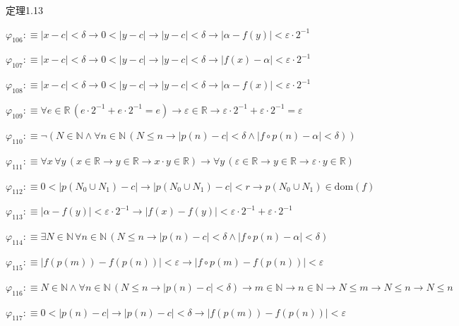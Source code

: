 \begin{fullproof}{定理1.13}
\begin{abbrevlist}
\item $\varphi_{106} :\equiv \lvert x - c \rvert < \delta \to 0 < \lvert y - c \rvert \to \lvert y - c \rvert < \delta \to \lvert \alpha - f(y) \rvert < \varepsilon \cdot 2^{-1}$
\item $\varphi_{107} :\equiv \lvert x - c \rvert < \delta \to 0 < \lvert y - c \rvert \to \lvert y - c \rvert < \delta \to \lvert f(x) - \alpha \rvert < \varepsilon \cdot 2^{-1}$
\item $\varphi_{108} :\equiv \lvert x - c \rvert < \delta \to 0 < \lvert y - c \rvert \to \lvert y - c \rvert < \delta \to \lvert \alpha - f(x) \rvert < \varepsilon \cdot 2^{-1}$
\item $\varphi_{109} :\equiv \forall e \in \mathbb{R}\,(e \cdot 2^{-1} + e \cdot 2^{-1} = e) \to \varepsilon \in \mathbb{R} \to \varepsilon \cdot 2^{-1} + \varepsilon \cdot 2^{-1} = \varepsilon$
\item $\varphi_{110} :\equiv \neg (N \in \mathbb{N} \land \forall n \in \mathbb{N}\,(N \leq n \to \lvert p(n) - c \rvert < \delta \land \lvert f \circ p(n) - \alpha \rvert < \delta))$
\item $\varphi_{111} :\equiv \forall x\,\forall y\,(x \in \mathbb{R} \to y \in \mathbb{R} \to x \cdot y \in \mathbb{R}) \to \forall y\,(\varepsilon \in \mathbb{R} \to y \in \mathbb{R} \to \varepsilon \cdot y \in \mathbb{R})$
\item $\varphi_{112} :\equiv 0 < \lvert p(N_{0} \cup N_{1}) - c \rvert \to \lvert p(N_{0} \cup N_{1}) - c \rvert < r \to p(N_{0} \cup N_{1}) \in \mathrm{dom}(f)$
\item $\varphi_{113} :\equiv \lvert \alpha - f(y) \rvert < \varepsilon \cdot 2^{-1} \to \lvert f(x) - f(y) \rvert < \varepsilon \cdot 2^{-1} + \varepsilon \cdot 2^{-1}$
\item $\varphi_{114} :\equiv \exists N \in \mathbb{N}\,\forall n \in \mathbb{N}\,(N \leq n \to \lvert p(n) - c \rvert < \delta \land \lvert f \circ p(n) - \alpha \rvert < \delta)$
\item $\varphi_{115} :\equiv \lvert f(p(m)) - f(p(n)) \rvert < \varepsilon \to \lvert f \circ p(m) - f(p(n)) \rvert < \varepsilon$
\item $\varphi_{116} :\equiv N \in \mathbb{N} \land \forall n \in \mathbb{N}\,(N \leq n \to \lvert p(n) - c \rvert < \delta) \to m \in \mathbb{N} \to n \in \mathbb{N} \to N \leq m \to N \leq n \to N \leq n$
\item $\varphi_{117} :\equiv 0 < \lvert p(n) - c \rvert \to \lvert p(n) - c \rvert < \delta \to \lvert f(p(m)) - f(p(n)) \rvert < \varepsilon$

\end{abbrevlist}
\end{fullproof}
